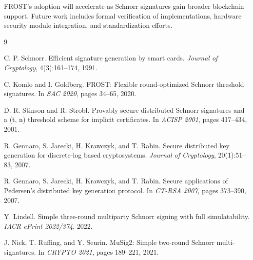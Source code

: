 \documentclass[11pt,a4paper]{article}
\begin{document}
FROST's adoption will accelerate as Schnorr signatures gain broader blockchain support. Future work includes formal verification of implementations, hardware security module integration, and standardization efforts.


\begin{thebibliography}{9}

C. P. Schnorr.
\newblock Efficient signature generation by smart cards.
\newblock \textit{Journal of Cryptology}, 4(3):161--174, 1991.

C. Komlo and I. Goldberg.
\newblock FROST: Flexible round-optimized Schnorr threshold signatures.
\newblock In \textit{SAC 2020}, pages 34--65, 2020.

D. R. Stinson and R. Strobl.
\newblock Provably secure distributed Schnorr signatures and a (t, n) threshold scheme for implicit certificates.
\newblock In \textit{ACISP 2001}, pages 417--434, 2001.

R. Gennaro, S. Jarecki, H. Krawczyk, and T. Rabin.
\newblock Secure distributed key generation for discrete-log based cryptosystems.
\newblock \textit{Journal of Cryptology}, 20(1):51--83, 2007.

R. Gennaro, S. Jarecki, H. Krawczyk, and T. Rabin.
\newblock Secure applications of Pedersen's distributed key generation protocol.
\newblock In \textit{CT-RSA 2007}, pages 373--390, 2007.

Y. Lindell.
\newblock Simple three-round multiparty Schnorr signing with full simulatability.
\newblock \textit{IACR ePrint 2022/374}, 2022.

J. Nick, T. Ruffing, and Y. Seurin.
\newblock MuSig2: Simple two-round Schnorr multi-signatures.
\newblock In \textit{CRYPTO 2021}, pages 189--221, 2021.

\end{thebibliography}
\end{document}
